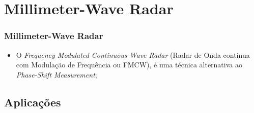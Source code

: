 \documentclass[xcolor=dvipsnames, aspectratio=169]{beamer}
\begin{document}
\section[Millimeter-Wave Radar]{Millimeter-Wave Radar} 
\begin{frame}
\frametitle{Millimeter-Wave Radar}
	\begin{itemize}
		\item O \textit{Frequency Modulated Continuous Wave Radar} (Radar de Onda contínua com Modulação de Frequência ou FMCW), é uma técnica alternativa ao \textit{Phase-Shift Measurement};
	\end{itemize}
\end{frame}


    \subsection[Introdução]{Aplicações} 
\end{document}
